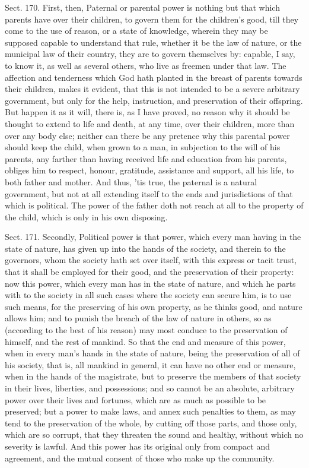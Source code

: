 \documentclass[11pt,openany]{book}
\begin{document}
Sect. 170. First, then, Paternal or parental power is nothing but that which parents have over their children, to govern them for the children's good, till they come to the use of reason, or a state of knowledge, wherein they may be supposed capable to understand that rule, whether it be the law of nature, or the municipal law of their country, they are to govern themselves by: capable, I say, to know it, as well as several others, who live as freemen under that law. The affection and tenderness which God hath planted in the breast of parents towards their children, makes it evident, that this is not intended to be a severe arbitrary government, but only for the help, instruction, and preservation of their offspring. But happen it as it will, there is, as I have proved, no reason why it should be thought to extend to life and death, at any time, over their children, more than over any body else; neither can there be any pretence why this parental power should keep the child, when grown to a man, in subjection to the will of his parents, any farther than having received life and education from his parents, obliges him to respect, honour, gratitude, assistance and support, all his life, to both father and mother. And thus, 'tis true, the paternal is a natural government, but not at all extending itself to the ends and jurisdictions of that which is political. The power of the father doth not reach at all to the property of the child, which is only in his own disposing.

Sect. 171. Secondly, Political power is that power, which every man having in the state of nature, has given up into the hands of the society, and therein to the governors, whom the society hath set over itself, with this express or tacit trust, that it shall be employed for their good, and the preservation of their property: now this power, which every man has in the state of nature, and which he parts with to the society in all such cases where the society can secure him, is to use such means, for the preserving of his own property, as he thinks good, and nature allows him; and to punish the breach of the law of nature in others, so as (according to the best of his reason) may most conduce to the preservation of himself, and the rest of mankind. So that the end and measure of this power, when in every man's hands in the state of nature, being the preservation of all of his society, that is, all mankind in general, it can have no other end or measure, when in the hands of the magistrate, but to preserve the members of that society in their lives, liberties, and possessions; and so cannot be an absolute, arbitrary power over their lives and fortunes, which are as much as possible to be preserved; but a power to make laws, and annex such penalties to them, as may tend to the preservation of the whole, by cutting off those parts, and those only, which are so corrupt, that they threaten the sound and healthy, without which no severity is lawful. And this power has its original only from compact and agreement, and the mutual consent of those who make up the community.
\end{document}
